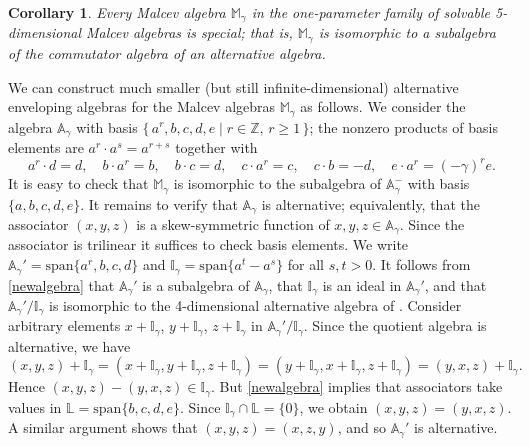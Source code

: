 \documentclass{amsart}
\theoremstyle{plain}
\newtheorem{corollary}[lemma]{Corollary}
\theoremstyle{definition}
\begin{document}
\begin{corollary}
Every Malcev algebra $\mathbb{M}_\gamma$ in the one-parameter family of
solvable 5-dimensional Malcev algebras is special; that is, $\mathbb{M}_\gamma$
is isomorphic to a subalgebra of the commutator algebra of an alternative
algebra.
\end{corollary}

We can construct much smaller (but still infinite-dimensional) alternative
enveloping algebras for the Malcev algebras $\mathbb{M}_\gamma$ as follows. We
consider the algebra $\mathbb{A}_\gamma$ with basis $\{ \, a^r, b, c, d, e \mid
r \in \mathbb{Z}, \, r \ge 1 \, \} $; the nonzero products of basis elements
are $a^r \cdot a^s = a^{r+s}$ together with
  \begin{equation} \label{newalgebra}
  \;
  a^r \cdot d = d,
  \quad
  b \cdot a^r = b,
  \quad
  b \cdot c = d,
  \quad
  c \cdot a^r = c,
  \quad
  c \cdot b = -d,
  \quad
  e \cdot a^r = (-\gamma)^r e.
  \end{equation}
It is easy to check that $\mathbb{M}_\gamma$ is isomorphic to the subalgebra of
$\mathbb{A}_\gamma^-$ with basis $\{ a, b, c, d, e \}$. It remains to verify
that $\mathbb{A}_\gamma$ is alternative; equivalently, that the associator
$(x,y,z)$ is a skew-symmetric function of $x, y, z \in \mathbb{A}_\gamma$.
Since the associator is trilinear it suffices to check basis elements. We write
$\mathbb{A}_\gamma' = \mathrm{span}\{ a^r, b, c, d \}$ and $\mathbb{I}_\gamma =
\mathrm{span}\{ a^t - a^s \}$ for all $s,t>0$. It follows from
\eqref{newalgebra} that $\mathbb{A}_\gamma'$ is a subalgebra of
$\mathbb{A}_\gamma$, that $\mathbb{I}_\gamma$ is an ideal in
$\mathbb{A}_\gamma'$, and that $\mathbb{A}_\gamma'/\mathbb{I}_\gamma$ is
isomorphic to the 4-dimensional alternative algebra of \cite[Table 3]{BHPU}.
Consider arbitrary elements $x + \mathbb{I}_\gamma$, $y + \mathbb{I}_\gamma$,
$z + \mathbb{I}_\gamma$ in $\mathbb{A}_\gamma'/\mathbb{I}_\gamma$. Since the
quotient algebra is alternative, we have
  \[
  (x,y,z) + \mathbb{I}_\gamma
  =
  (x + \mathbb{I}_\gamma, y + \mathbb{I}_\gamma, z + \mathbb{I}_\gamma)
  =
  (y + \mathbb{I}_\gamma, x + \mathbb{I}_\gamma, z + \mathbb{I}_\gamma)
  =
  (y,x,z) + \mathbb{I}_\gamma.
  \]
Hence $(x,y,z) - (y,x,z) \in \mathbb{I}_\gamma$. But \eqref{newalgebra} implies
that associators take values in $\mathbb{L} = \mathrm{span}\{b,c,d,e\}$.  Since
$\mathbb{I}_\gamma \cap \mathbb{L} = \{0\}$, we obtain $(x,y,z) = (y,x,z)$. A
similar argument shows that $(x,y,z) = (x,z,y)$, and so $\mathbb{A}_\gamma'$ is
alternative.
\end{document}
